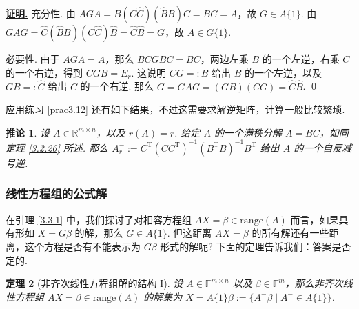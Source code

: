 \documentclass[10pt,openany]{article}
\theoremstyle{thmstyle} %
\newtheorem{theorem}{定理}[subsection]
\theoremstyle{defstyle} %
\newtheorem{corollary}[theorem]{推论}
\theoremstyle{prostyle} %
\theoremstyle{exastyle}
\theoremstyle{remstyle}
\renewenvironment{proof}[1][证明]{\par\underline{\textbf{#1.}} \;\fangsong}{\qed\par}
\newcommand{\T}{^{\text{T}}}
\newcommand{\F}{\mathbb{F}}
\newcommand{\R}{\mathbb{R}}
\newcommand{\mn}{^{m \times n}}
\begin{document}
\begin{proof}
	充分性. 由 \( AGA=B(C\hat{C})(\hat{B}B)C=BC=A \)，故 \( G \in A\{1\} \). 由 \( GAG=\hat{C}(\hat{B}B)(C\hat{C})\hat{B}=\hat{C}\hat{B}=G \)，故 \( A \in G\{1\} \). 
	
	必要性. 由于 \( AGA=A \)，那么 \( BCGBC=BC \)，两边左乘 \( B \) 的一个左逆，右乘 \( C \) 的一个右逆，得到 \( CGB=E_r \). 这说明 \( CG=:\hat{B} \) 给出 \( B \) 的一个左逆，以及 \( GB=:\hat{C} \) 给出 \( C \) 的一个右逆. 那么 \( G=GAG=(GB)(CG)=\hat{C}\hat{B} \).
\end{proof}

应用练习 \ref{prac3.12} 还有如下结果，不过这需要求解逆矩阵，计算一般比较繁琐.

\begin{corollary}
	设 \( A \in \R\mn \)，以及 \( r(A)=r \). 给定 \( A \) 的一个满秩分解 \( A=BC \)，如同定理 \ref{3.2.26} 所述. 那么 \( A_r^{-}:=C\T (CC\T)^{-1}(B\T B)^{-1} B\T \) 给出 \( A \) 的一个自反减号逆.
\end{corollary}

\subsubsection{线性方程组的公式解}

在引理 \ref{3.3.1} 中，我们探讨了对相容方程组 \( AX=\beta \in \text{range}(A) \) 而言，如果具有形如 \( X=G\beta \) 的解，那么 \( G \in A\{1 \} \). 但这距离 \( AX=\beta \) 的所有解还有一些距离，这个方程是否有不能表示为 \( G\beta \) 形式的解呢? 下面的定理告诉我们：答案是否定的.


\begin{theorem}[非齐次线性方程组解的结构 I] \label{3.3.13}
	设 \( A \in \F\mn \) 以及 \( \beta \in \F^m \)，那么非齐次线性方程组 \( AX=\beta \in \text{range}(A) \) 的解集为 \( X=A\{1\}\beta:=\{A^{-}\beta\mid A^{-} \in A\{1\}\} \). 
\end{theorem}
\end{document}
